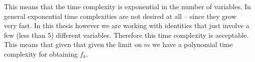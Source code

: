 This means that the time complexity is exponential in the number of variables. In general exponential time complexities are not desired at all -- since they grow very fast. In this thesis however we are working with identities that just involve a few (less than 5) different variables. Therefore this time complexity is acceptable. This means that given that given the limit on $m$ we have a polynomial time complexity for obtaining $f_k$.

